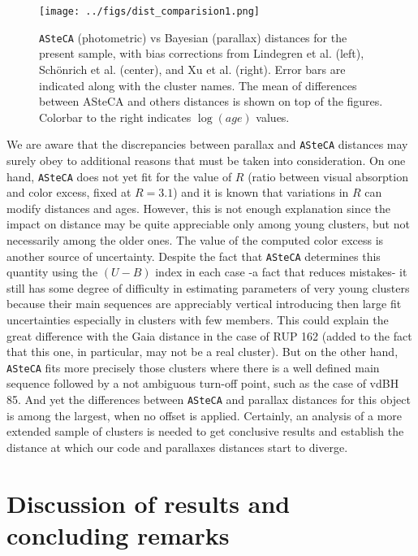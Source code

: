 \documentclass[draft]{aa}
\begin{document}
\begin{figure}[ht]
    \centering
    \texttt{[image: ../figs/dist\_comparision1.png]}
    \caption{\texttt{ASteCA} (photometric) vs Bayesian (parallax) distances for
    the present sample, with bias corrections from Lindegren et al. (left),
    Sch\"onrich et al. (center), and Xu et al. (right). Error bars are
    indicated along with the cluster names. The mean of differences between
    ASteCA and others distances is shown on top of the figures. Colorbar to
    the right indicates $\log(age)$ values.}
    \label{fig:prlxbias}
\end{figure}

We are aware that the discrepancies between parallax and \texttt{ASteCA}
distances may surely obey to additional reasons that must be taken into
consideration. On one hand, \texttt{ASteCA} does not yet fit for the value of
$R$ (ratio between visual absorption and color excess, fixed at $R=3.1$) and it
is known that variations in $R$ can modify distances and ages. However, this is
not enough explanation since the impact on distance may be quite appreciable
only among young clusters, but not necessarily among the older ones. The value
of the computed color excess is another source of uncertainty. 
Despite the fact that \texttt{ASteCA} determines this quantity using the
$(U-B)$ index in each case -a fact that reduces mistakes- it still has some
degree of difficulty in estimating parameters of very young clusters because
their main sequences are appreciably vertical introducing then large fit
uncertainties especially in clusters with few members. This could explain the
great difference with the Gaia distance in the case of RUP 162 (added to the
fact that this one, in particular, may not be a real cluster). But on the other
hand, \texttt{ASteCA} fits more precisely those clusters where there is a well
defined main sequence followed by a not ambiguous turn-off point, such as the
case of vdBH 85. And yet the differences between \texttt{ASteCA} and parallax
distances for this object is among the largest, when no offset is applied.
Certainly, an analysis of a more extended sample of clusters is needed to get
conclusive results and establish the distance at which our code and parallaxes
distances start to diverge.





\section{Discussion of results and concluding remarks}
\label{sec:results_concl}
\end{document}

